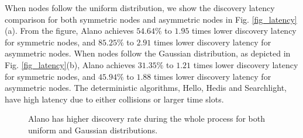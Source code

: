 When nodes follow the uniform distribution, we show the discovery latency
comparison for both symmetric nodes and asymmetric nodes in Fig.
\ref{fig_latency}(a).
From the figure, Alano achieves $54.64\%$ to $1.95$ times lower
discovery latency for symmetric nodes, and $85.25\%$ to $2.91$ times
lower discovery latency for asymmetric nodes.
When nodes follow the Gaussian distribution, as depicted in Fig.
\ref{fig_latency}(b),
Alano achieves $31.35\%$ to $1.21$ times lower discovery latency for symmetric nodes, 
and $45.94\%$ to $1.88$ times lower discovery latency for asymmetric nodes.
The deterministic algorithms, Hello, Hedis and Searchlight, have high
latency due to either collisions or larger time slots.



\begin{figure}[!h]

\hspace{0.01in}
\hspace{0.01in}
\hspace{0.01in}
\caption{Alano has higher discovery rate during the whole process for both uniform and Gaussian distributions.}
\label{fig_timerate_large}
\end{figure}

